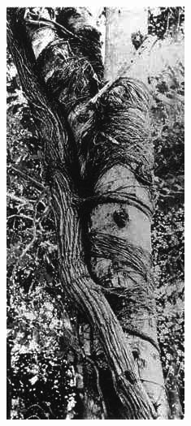 \begin{figure}[t]
	\begin{minipage}[t]{0.9\textwidth}
		\begin{minipage}[t]{(\textwidth-\fgap) * \real{0.422}}
			\centering
			\includegraphics[width=\textwidth]{graphics/figure48puka-roots.jpg}

\end{minipage}
\end{minipage}
\end{figure}
